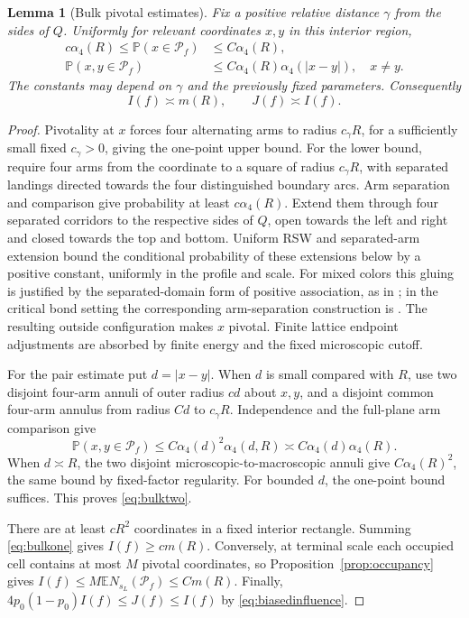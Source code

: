 \documentclass[11pt]{amsart}
\newtheorem{lemma}[theorem]{Lemma}
\theoremstyle{remark}
\newcommand{\Prob}{\mathbb P}
\newcommand{\E}{\mathbb E}
\newcommand{\cP}{\mathcal P}
\begin{document}
\begin{lemma}[Bulk pivotal estimates]\label{lem:bulkmoments}
Fix a positive relative distance $\gamma$ from the sides of $Q$. Uniformly for relevant coordinates $x,y$ in this interior region,
\begin{align}
 c\alpha_4(R)\le\Prob(x\in\cP_f)&\le C\alpha_4(R),\label{eq:bulkone}\\
 \Prob(x,y\in\cP_f)&\le C\alpha_4(R)\alpha_4(|x-y|),\quad x\ne y.\label{eq:bulktwo}
\end{align}
The constants may depend on $\gamma$ and the previously fixed parameters. Consequently
\begin{equation}\label{eq:meancomparison}
 I(f)\asymp m(R),\qquad J(f)\asymp I(f).
\end{equation}
\end{lemma}
\begin{proof}
Pivotality at $x$ forces four alternating arms to radius $c_\gamma R$, for a sufficiently small fixed $c_\gamma>0$, giving the one-point upper bound. For the lower bound, require four arms from the coordinate to a square of radius $c_\gamma R$, with separated landings directed towards the four distinguished boundary arcs. Arm separation and comparison give probability at least $c\alpha_4(R)$. Extend them through four separated corridors to the respective sides of $Q$, open towards the left and right and closed towards the top and bottom. Uniform RSW and separated-arm extension bound the conditional probability of these extensions below by a positive constant, uniformly in the profile and scale. For mixed colors this gluing is justified by the separated-domain form of positive association, as in \cite[Lemma~13 and Theorem~11]{Nolin}; in the critical bond setting the corresponding arm-separation construction is \cite[Appendix, Lemma~A.2 and Remark~A.7]{SS}. The resulting outside configuration makes $x$ pivotal. Finite lattice endpoint adjustments are absorbed by finite energy and the fixed microscopic cutoff.

For the pair estimate put $d=|x-y|$. When $d$ is small compared with $R$, use two disjoint four-arm annuli of outer radius $cd$ about $x,y$, and a disjoint common four-arm annulus from radius $Cd$ to $c_\gamma R$. Independence and the full-plane arm comparison give
\[
 \Prob(x,y\in\cP_f)\le C\alpha_4(d)^2\alpha_4(d,R)
 \asymp C\alpha_4(d)\alpha_4(R).
\]
When $d\asymp R$, the two disjoint microscopic-to-macroscopic annuli give $C\alpha_4(R)^2$, the same bound by fixed-factor regularity. For bounded $d$, the one-point bound suffices. This proves \eqref{eq:bulktwo}.

There are at least $cR^2$ coordinates in a fixed interior rectangle. Summing \eqref{eq:bulkone} gives $I(f)\ge cm(R)$. Conversely, at terminal scale each occupied cell contains at most $M$ pivotal coordinates, so Proposition~\ref{prop:occupancy} gives $I(f)\le M\E N_{s_L}(\cP_f)\le Cm(R)$. Finally, $4p_0(1-p_0)I(f)\le J(f)\le I(f)$ by \eqref{eq:biasedinfluence}.
\end{proof}
\end{document}

